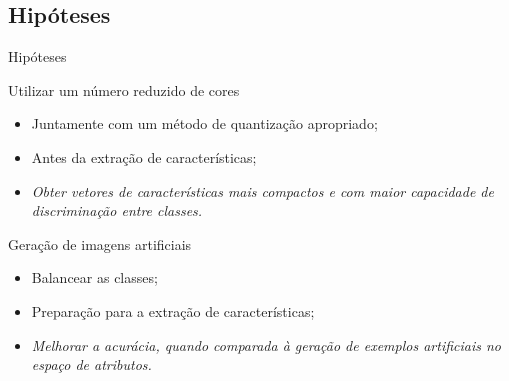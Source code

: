 \documentclass{beamer}
\begin{document}
\subsection{Hipóteses}
\setlength\leftmargini{1em}
\justifying
\begin{frame}{Hipóteses}
  \begin{block}{Utilizar um número reduzido de cores}
    \justifying
    \begin{itemize}
      \item Juntamente com um método de quantização apropriado;
      \item Antes da extração de características;
      \item \textit{Obter vetores de características mais compactos e com maior capacidade de discriminação entre classes.}
    \end{itemize}
  \end{block}
  \begin{block}{Geração de imagens artificiais}
    \justifying
    \begin{itemize}
      \item Balancear as classes;
      \item Preparação para a extração de características;
      \item \textit{Melhorar a acurácia, quando comparada à geração de exemplos artificiais no espaço de atributos.}
    \end{itemize}
  \end{block}
\end{frame}
\end{document}
